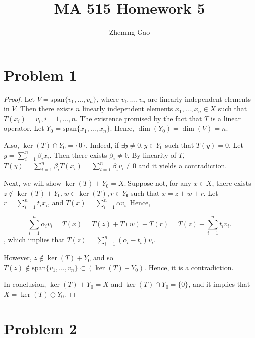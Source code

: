 \documentclass[12pt]{article}
\begin{document}
 
 
\title{MA 515 Homework 5}
\author{Zheming Gao}
\maketitle

\section*{Problem 1}

\begin{proof}

Let $V = \text{span}\{v_1, \dots, v_n\}$, where $v_1, \dots, v_n$ are linearly independent elements in $V$. Then there exists $n$ linearly independent elements $x_1, \dots, x_n \in X$ such that $T(x_i) = v_i, i = 1, \dots, n$. The existence promised by the fact that $T$ is a linear operator. Let $Y_0 = \text{span}\{x_1, \dots, x_n\}$. Hence, $\dim(Y_0) = \dim(V) = n$.

Also, $\ker(T) \cap Y_0 = \{0\}$. Indeed, if $\exists y\neq 0, y\in Y_0$ such that $T(y)=0$. Let $y = \sum_{i=1}^n \beta_i x_i$. Then there exists $\beta_i \neq 0$. By linearity of $T$, $T(y) = \sum_{i=1}^n \beta_i T(x_i) = \sum_{i=1}^n \beta_i v_i \neq 0$ and it yields a contradiction.

Next, we will show $\ker(T) + Y_0 = X$. Suppose not, for any $x\in X$, there exists $z \notin \ker(T) + Y_0, w\in \ker(T), r\in Y_0$ such that $x = z + w + r$. Let $r = \sum_{i=1}^n t_i x_i$, and $T(x) = \sum_{i=1}^n \alpha v_i$.  Hence, 

$$
\sum_{i=1}^n \alpha_i v_i = T(x) = T(z) + T(w) + T(r) = T(z) + \sum_{i=1}^n t_i v_i.
$$, which implies that $T(z) = \sum_{i=1}^n (\alpha_i - t_i) v_i$.

However, $z\notin \ker(T) + Y_0$ and so $T(z)\notin \text{span}\{ v_1, \dots, v_n \}\subset (\ker(T) + Y_0)$. Hence, it is a contradiction.

In conclusion, $\ker(T)+Y_0 = X$ and $\ker(T)\cap Y_0 = \{0\}$, and it implies that $X = \ker(T) \oplus Y_0$.

\end{proof}


\section*{Problem 2}
\end{document}
